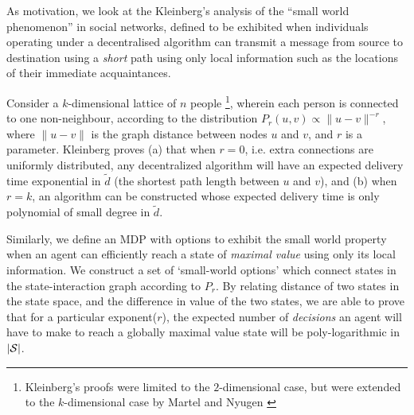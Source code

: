 \label{sec:approach}

As motivation, we look at the Kleinberg's analysis of the ``small
world phenomenon'' in social networks, defined to be exhibited when
individuals operating under a decentralised algorithm can transmit a
message from source to destination using a {\em short} path using only
local information such as the locations of their immediate
acquaintances. 

Consider a $k$-dimensional lattice of $n$ people \footnote{
Kleinberg's proofs were limited to the $2$-dimensional case, but were
extended to the $k$-dimensional case by Martel and Nyugen
\cite{Martel2004} }, wherein each person is connected to one
non-neighbour, according to the distribution $P_{r}( u, v )
\propto \| u-v \|^{-r}$, where $\|u-v\|$ is the graph distance between
nodes $u$ and $v$, and $r$ is a parameter. Kleinberg proves (a) that
when $r=0$, i.e. extra connections are uniformly distributed, any
decentralized algorithm will have an expected delivery time
exponential in $\tilde{d}$ (the shortest path length between $u$ and
$v$), and (b) when $r=k$, an algorithm can be constructed whose
expected delivery time is only polynomial of small degree in
$\tilde{d}$.

Similarly, we define an MDP with options to exhibit the small world
property when an agent can efficiently reach a state of {\em maximal
value} using only its local information. We construct a set of
`small-world options' which connect states in the state-interaction
graph according to $P_r$. By relating distance of two
states in the state space, and the difference in value of the two
states, we are able to prove that for a particular exponent($r$), the
expected number of {\em decisions} an agent will have to make to reach
a globally maximal value state will be poly-logarithmic in
$|\mathcal{S}|$. 

